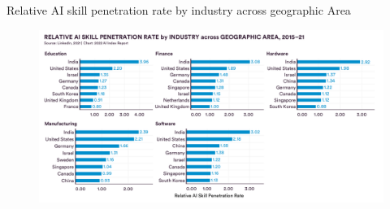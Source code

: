 %
%
%
%

{

\begin{frame}{
Relative AI skill penetration rate by industry across geographic Area
}

\begin{figure}
 \centering
 \includegraphics[width=1.0\textwidth]{./figures/progress-of-air-e/outputs/drawing-v00.png}
\end{figure}

\end{frame}
}



%
%
%
%





